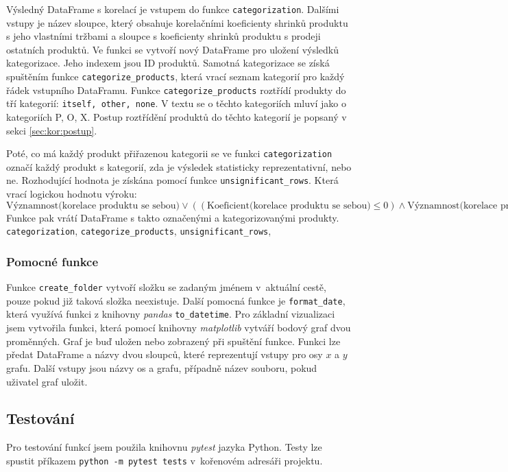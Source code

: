 Výsledný DataFrame s korelací je vstupem do funkce \texttt{categorization}.  Dalšími vstupy je název sloupce, který obsahuje korelačními koeficienty shrinků produktu s jeho vlastními tržbami a sloupce s koeficienty shrinků produktu s prodeji ostatních produktů. Ve funkci se vytvoří nový DataFrame pro uložení výsledků kategorizace. Jeho indexem jsou ID produktů. Samotná kategorizace se získá spuštěním funkce \texttt{categorize\_products}, která vrací seznam kategorií pro každý řádek vstupního DataFramu. Funkce \texttt{categorize\_products} roztřídí produkty do tří kategorií: \texttt{itself, other, none}. V textu se o těchto kategoriích mluví jako o kategoriích P, O, X. Postup roztřídění produktů do těchto kategorií je popsaný v sekci \ref{sec:kor:postup}.

Poté, co má každý produkt přiřazenou kategorii se ve funkci \texttt{categorization} označí každý produkt s kategorií, zda je výsledek statisticky reprezentativní, nebo ne. Rozhodující hodnota je získána pomocí funkce \texttt{unsignificant\_rows}. Která vrací logickou hodnotu výroku:
$$ \mbox{Významnost(korelace produktu se sebou)} \lor ( (\mbox{Koeficient(korelace produktu se sebou)} \leq 0) \land  \mbox{Významnost(korelace produktu s ostatními)} ) $$
Funkce pak vrátí DataFrame s takto označenými a kategorizovanými produkty.
\texttt{categorization}, \texttt{categorize\_products}, \texttt{unsignificant\_rows}, 

\subsubsection*{Pomocné funkce}

Funkce \texttt{create\_folder} vytvoří složku se zadaným jménem v~aktuální cestě, pouze pokud již taková složka neexistuje. Další pomocná funkce je \texttt{format\_date}, která využívá funkci z knihovny \emph{pandas} \texttt{to\_datetime}. 
Pro základní vizualizaci jsem vytvořila funkci, která pomocí knihovny \emph{matplotlib} vytváří bodový graf dvou proměnných. Graf je buď uložen nebo zobrazený při spuštění funkce. Funkci lze předat DataFrame a názvy dvou sloupců, které reprezentují vstupy pro osy $x$ a $y$ grafu. Další vstupy jsou názvy os a grafu, případně název souboru, pokud uživatel graf uložit. 

\subsection{Testování}

Pro testování funkcí jsem použila knihovnu \emph{pytest} jazyka Python. Testy lze spustit příkazem \texttt{python -m pytest tests} v~kořenovém adresáři projektu.


